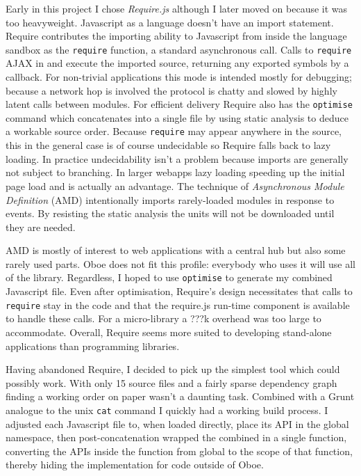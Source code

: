 \documentclass[]{article}
\begin{document}
Early in this project I chose \emph{Require.js} although I later moved
on because it was too heavyweight. Javascript as a language doesn't have
an import statement. Require contributes the importing ability to
Javascript from inside the language sandbox as the \texttt{require}
function, a standard asynchronous call. Calls to \texttt{require} AJAX
in and execute the imported source, returning any exported symbols by a
callback. For non-trivial applications this mode is intended mostly for
debugging; because a network hop is involved the protocol is chatty and
slowed by highly latent calls between modules. For efficient delivery
Require also has the \texttt{optimise} command which concatenates into a
single file by using static analysis to deduce a workable source order.
Because \texttt{require} may appear anywhere in the source, this in the
general case is of course undecidable so Require falls back to lazy
loading. In practice undecidability isn't a problem because imports are
generally not subject to branching. In larger webapps lazy loading
speeding up the initial page load and is actually an advantage. The
technique of \emph{Asynchronous Module Definition} (AMD) intentionally
imports rarely-loaded modules in response to events. By resisting the
static analysis the units will not be downloaded until they are needed.

AMD is mostly of interest to web applications with a central hub but
also some rarely used parts. Oboe does not fit this profile: everybody
who uses it will use all of the library. Regardless, I hoped to use
\texttt{optimise} to generate my combined Javascript file. Even after
optimisation, Require's design necessitates that calls to
\texttt{require} stay in the code and that the require.js run-time
component is available to handle these calls. For a micro-library a ???k
overhead was too large to accommodate. Overall, Require seems more
suited to developing stand-alone applications than programming
libraries.

Having abandoned Require, I decided to pick up the simplest tool which
could possibly work. With only 15 source files and a fairly sparse
dependency graph finding a working order on paper wasn't a daunting
task. Combined with a Grunt analogue to the unix \texttt{cat} command I
quickly had a working build process. I adjusted each Javascript file to,
when loaded directly, place its API in the global namespace, then
post-concatenation wrapped the combined in a single function, converting
the APIs inside the function from global to the scope of that function,
thereby hiding the implementation for code outside of Oboe.
\end{document}
